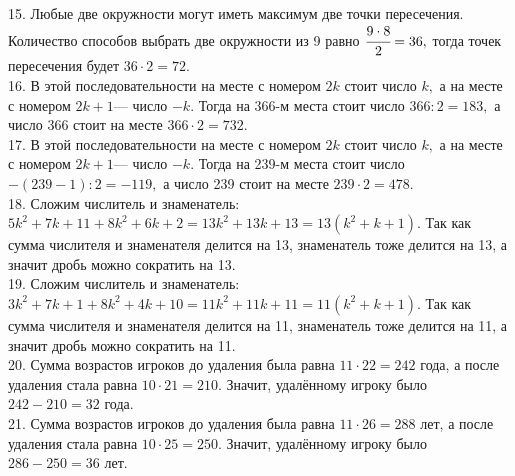 \documentclass[12pt]{article}
\begin{document}
\begin{figure}[ht!]
\end{figure}\\
15. Любые две окружности могут иметь максимум две точки пересечения. Количество способов выбрать две окружности из 9 равно $\cfrac{9\cdot8}{2}=36,$ тогда точек пересечения будет $36\cdot2=72.$\\
16. В этой последовательности на месте с номером $2k$ стоит число $k,$ а на месте с номером $2k+1$--- число $-k.$ Тогда на 366-м места стоит число $366:2=183,$ а число 366 стоит на месте $366\cdot2=732.$\\
17. В этой последовательности на месте с номером $2k$ стоит число $k,$ а на месте с номером $2k+1$--- число $-k.$ Тогда на 239-м места стоит число $-(239-1):2=-119,$ а число 239 стоит на месте $239\cdot2=478.$\\
18. Сложим числитель и знаменатель: $5k^2+7k+11+8k^2+6k+2=13k^2+13k+13=13(k^2+k+1).$ Так как сумма числителя и знаменателя делится на 13, знаменатель тоже делится на 13, а значит дробь можно сократить на 13.\\
19. Сложим числитель и знаменатель: $3k^2+7k+1+8k^2+4k+10=11k^2+11k+11=11(k^2+k+1).$ Так как сумма числителя и знаменателя делится на 11, знаменатель тоже делится на 11, а значит дробь можно сократить на 11.\\
20. Сумма возрастов игроков до удаления была равна $11\cdot22=242$ года, а после удаления стала равна $10\cdot21=210.$ Значит, удалённому игроку было $242-210=32$ года.\\
21. Сумма возрастов игроков до удаления была равна $11\cdot26=288$ лет, а после удаления стала равна $10\cdot25=250.$ Значит, удалённому игроку было $286-250=36$ лет.\\
\end{document}

